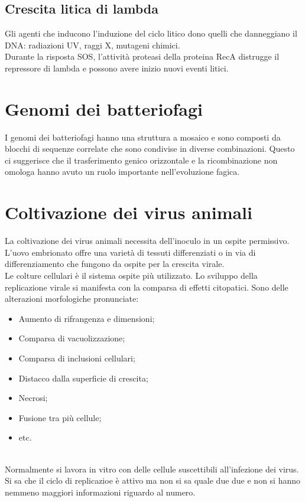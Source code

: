 \subsection{Crescita litica di lambda}
Gli agenti che inducono l'induzione del ciclo litico dono quelli che danneggiano il DNA: radiazioni UV, raggi X, mutageni chimici. 
\\Durante la risposta SOS, l'attività proteasi della proteina RecA distrugge il repressore di lambda e possono avere inizio nuovi eventi litici. 
\section{Genomi dei batteriofagi}
I genomi dei batteriofagi hanno una struttura a mosaico e sono composti da blocchi di sequenze correlate che sono condivise in diverse combinazioni. Questo ci suggerisce che il trasferimento genico orizzontale e la ricombinazione non omologa hanno avuto un ruolo importante nell'evoluzione fagica. 
\section{Coltivazione dei virus animali}
La coltivazione dei virus animali necessita dell'inoculo in un ospite permissivo. L'uovo embrionato offre una varietà di tessuti differenziati o in via di differenziamento che fungono da ospite per la crescita virale.
\\Le colture cellulari è il sistema ospite più utilizzato. Lo sviluppo della replicazione virale si manifesta con la comparsa di effetti citopatici. Sono delle alterazioni morfologiche pronunciate:
\begin{itemize}
    \item Aumento di rifrangenza e dimensioni;
    \item Comparsa di vacuolizzazione; 
    \item Comparsa di inclusioni cellulari; 
    \item Distacco dalla superficie di crescita;
    \item Necrosi; 
    \item Fusione tra più cellule; 
    \item etc.
\end{itemize}
\\Normalmente si lavora in vitro con delle cellule suscettibili all'infezione dei virus. 
\\Si sa che il ciclo di replicazioe è attivo ma non si sa quale due due e non si hanno nemmeno maggiori informazioni riguardo al numero.
